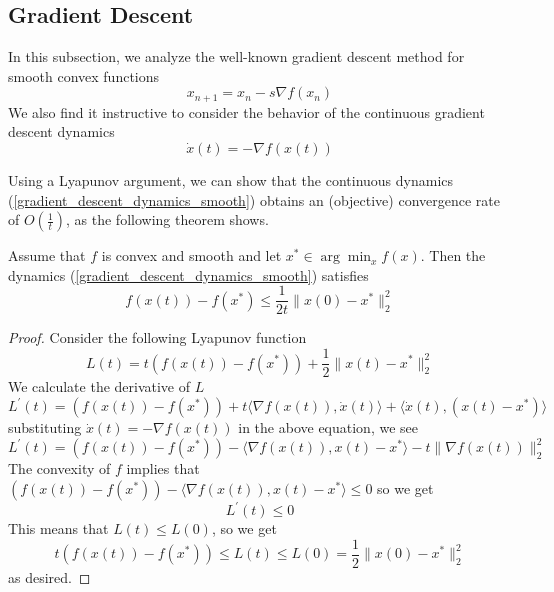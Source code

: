 \subsection{Gradient Descent}
In this subsection, we analyze the well-known gradient descent method for smooth convex functions
\begin{equation}\label{gradient_descent_smooth}
 x_{n+1} = x_n - s\nabla f(x_n)
\end{equation}
We also find it instructive to consider the behavior of the continuous gradient descent dynamics
\begin{equation}\label{gradient_descent_dynamics_smooth}
 \dot{x}(t) = -\nabla f(x(t))
\end{equation}

Using a Lyapunov argument, we can show that the continuous dynamics (\ref{gradient_descent_dynamics_smooth}) obtains
an (objective) convergence rate of $O(\frac{1}{t})$, as the following theorem shows.

\begin{theorem}\label{smooth_gradient_dynamics_thm} 
 Assume that $f$ is convex and smooth and let $x^*\in \arg\min_x f(x)$. 
 Then the dynamics (\ref{gradient_descent_dynamics_smooth}) satisfies
 \begin{equation}
  f(x(t)) - f(x^*) \leq \frac{1}{2t}\|x(0) - x^*\|_2^2
 \end{equation}

\end{theorem}
\begin{proof}
 Consider the following Lyapunov function
 \begin{equation}
  L(t) = t(f(x(t)) - f(x^*)) + \frac{1}{2}\|x(t) - x^*\|_2^2
 \end{equation}
 We calculate the derivative of $L$
 \begin{equation}
  L^\prime(t) = (f(x(t)) - f(x^*)) + t\langle\nabla f(x(t)), \dot{x}(t)\rangle + \langle\dot{x}(t), (x(t) - x^*)\rangle
 \end{equation}
 substituting $\dot{x}(t) = -\nabla f(x(t))$ in the above equation, we see
 \begin{equation}
  L^\prime(t) = (f(x(t)) - f(x^*)) - \langle\nabla f(x(t)), x(t) - x^*\rangle - t\|\nabla f(x(t))\|_2^2
 \end{equation}
 The convexity of $f$ implies that $(f(x(t)) - f(x^*)) - \langle\nabla f(x(t)), x(t) - x^*\rangle \leq 0$ so we get
 \begin{equation}
  L^\prime(t) \leq 0
 \end{equation}
 This means that $L(t) \leq L(0)$, so we get
 \begin{equation}
  t(f(x(t)) - f(x^*)) \leq L(t) \leq L(0) = \frac{1}{2}\|x(0) - x^*\|_2^2
 \end{equation}
 as desired.

\end{proof}


